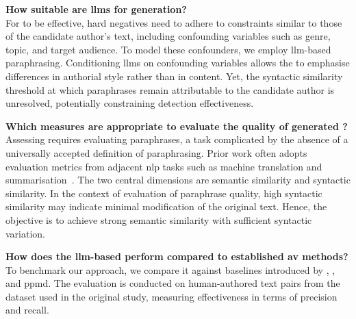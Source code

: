 \begin{questions}
    \item \textbf{How suitable are \acp{llm} for \imp{} generation?} \label{enum:rq1} \hfill \\
    For \imps{} to be effective, hard negatives need to adhere to constraints similar to those of the candidate author's text, including confounding variables such as genre, topic, and target audience.
    To model these confounders, we employ \ac{llm}-based paraphrasing. 
    Conditioning \acp{llm} on confounding variables allows the \impAppr{} to emphasise differences in authorial style rather than in content. 
    Yet, the syntactic similarity threshold at which paraphrases remain attributable to the candidate author is unresolved, potentially constraining detection effectiveness. 
   
    \item \textbf{Which measures are appropriate to evaluate the quality of generated \imps{}?} \label{enum:rq2} \hfill \\
    Assessing \imps{} requires evaluating paraphrases, a task complicated by the absence of a universally accepted definition of paraphrasing. 
    Prior work often adopts evaluation metrics from adjacent \ac{nlp} tasks such as machine translation and summarisation~\citep{gohsen_captions_2023}. 
    The two central dimensions are semantic similarity and syntactic similarity. 
    In the context of evaluation of paraphrase quality, high syntactic similarity may indicate minimal modification of the original text.
    Hence, the objective is to achieve strong semantic similarity with sufficient syntactic variation. 

    \item \textbf{How does the \ac{llm}-based \impAppr{} perform compared to established \ac{av} methods?} \label{enum:rq3} \hfill \\
    To benchmark our approach, we compare it against baselines introduced by \citet{koppel_determining_2014}, \unmasking{}, and \acs{ppmd}.
    The evaluation is conducted on human-authored text pairs from the \dataStudent{} dataset used in the original study, measuring effectiveness in terms of precision and recall.
    
\end{questions}

\newpage
